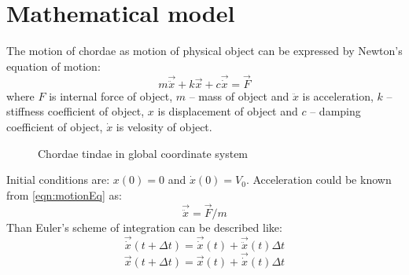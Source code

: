 \section*{Mathematical model}
The motion of chordae as motion of physical object can be expressed by Newton's
equation of motion:
\begin{equation}\label{eqn:motionEq}
  m\vec{\ddot{x}} + k\vec{x} + c\vec{\dot{x}} = \vec{F}
\end{equation}
where $F$ is internal force of object, $m$ – mass of object and $\ddot{x}$ is
acceleration, $k$ – stiffness coefficient of object, $x$ is displacement of
object and $c$ – damping coefficient of object, $\dot{x}$ is velosity of object.
\begin{figure}[H]\label{fig:chordaeInCoords}
  \centering
  
  \caption{Chordae tindae in global coordinate system}
\end{figure}
Initial conditions are: $x(0)=0$ and $\dot{x}(0)=V_0$.
Acceleration could be known from \eqref{eqn:motionEq} as:
\begin{equation}\label{eqn:Accel}
  \vec{\ddot{x}}=\vec{F}/m
\end{equation}
Than Euler's scheme of integration can be described like:
\begin{equation}\label{eqn:Velos}
  \vec{\dot{x}}(t +\Delta t)=\vec{\dot{x}}(t)+\vec{\ddot{x}}(t)\Delta t
\end{equation}
\begin{equation}\label{eqn:Displ}
  \vec{x}(t +\Delta t)=\vec{x}(t)+\vec{\dot{x}}(t)\Delta t
\end{equation}\par
